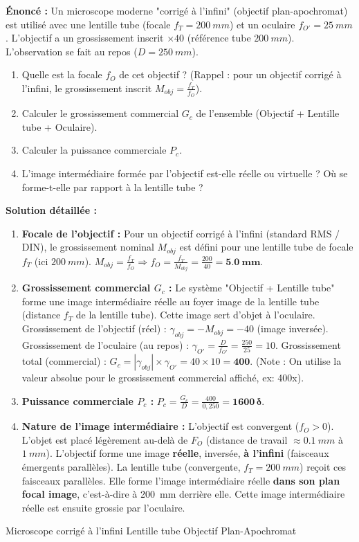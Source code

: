 \documentclass[11pt]{article}
\newcommand{\cle}[1]{{\popxbold\color{popdark}#1}}
\begin{document}
\begin{exoresolu}
\textbf{Énoncé :} Un microscope moderne "corrigé à l'infini" (objectif plan-apochromat) est utilisé avec une lentille tube (focale $f_T = \SI{200}{mm}$) et un oculaire $f_{O'} = \SI{25}{mm}$. L'objectif a un grossissement inscrit $\times 40$ (référence tube $\SI{200}{mm}$). L'observation se fait au repos ($D = \SI{250}{mm}$).
\begin{enumerate}
    \item Quelle est la focale $f_O$ de cet objectif ? (Rappel : pour un objectif corrigé à l'infini, le grossissement inscrit $M_{obj} = \frac{f_T}{f_O}$).
    \item Calculer le grossissement commercial $G_c$ de l'ensemble (Objectif + Lentille tube + Oculaire).
    \item Calculer la puissance commerciale $P_c$.
    \item L'image intermédiaire formée par l'objectif est-elle réelle ou virtuelle ? Où se forme-t-elle par rapport à la lentille tube ?
\end{enumerate}

\tcblower
\textbf{Solution détaillée :}
\begin{enumerate}
    \item \textbf{Focale de l'objectif :} Pour un objectif corrigé à l'infini (standard RMS / DIN), le grossissement nominal $M_{obj}$ est défini pour une lentille tube de focale $f_T$ (ici $\SI{200}{mm}$).
    $M_{obj} = \frac{f_T}{f_O} \Rightarrow f_O = \frac{f_T}{M_{obj}} = \frac{200}{40} = \mathbf{\SI{5,0}{mm}}$.
    \item \textbf{Grossissement commercial $G_c$ :}
    Le système "Objectif + Lentille tube" forme une image intermédiaire réelle au foyer image de la lentille tube (distance $f_T$ de la lentille tube). Cette image sert d'objet à l'oculaire.
    Grossissement de l'objectif (réel) : $\gamma_{obj} = -M_{obj} = -40$ (image inversée).
    Grossissement de l'oculaire (au repos) : $\gamma_{O'} = \frac{D}{f_{O'}} = \frac{250}{25} = 10$.
    Grossissement total (commercial) : $G_c = |\gamma_{obj}| \times \gamma_{O'} = 40 \times 10 = \mathbf{400}$.
    (Note : On utilise la valeur absolue pour le grossissement commercial affiché, ex: 400x).
    \item \textbf{Puissance commerciale $P_c$ :} $P_c = \frac{G_c}{D} = \frac{400}{0,250} = \mathbf{1600\,\delta}$.
    \item \textbf{Nature de l'image intermédiaire :}
    L'objectif est convergent ($f_O > 0$). L'objet est placé légèrement au-delà de $F_O$ (distance de travail $\approx \SI{0,1}{mm}$ à $\SI{1}{mm}$). L'objectif forme une image \textbf{réelle}, inversée, \textbf{à l'infini} (faisceaux émergents parallèles).
    La lentille tube (convergente, $f_T = \SI{200}{mm}$) reçoit ces faisceaux parallèles. Elle forme l'image intermédiaire réelle \textbf{dans son plan focal image}, c'est-à-dire à \SI{200}{mm} derrière elle.
    Cette image intermédiaire réelle est ensuite grossie par l'oculaire.
\end{enumerate}
\cle{Microscope corrigé à l'infini} \cle{Lentille tube} \cle{Objectif Plan-Apochromat}
\end{exoresolu}
\end{document}
